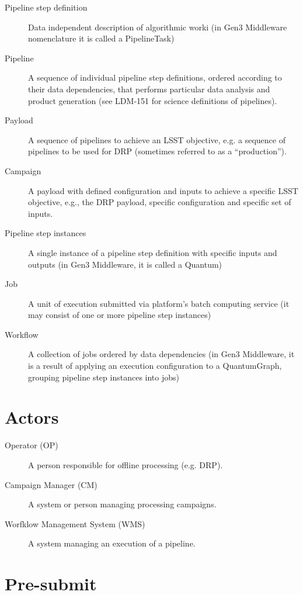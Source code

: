\documentclass[DM,lsstdraft,toc]{lsstdoc}
\begin{document}
\begin{description}
  \item[Pipeline step definition]
    Data independent description of algorithmic worki (in Gen3 Middleware
    nomenclature it is called a PipelineTask)
  \item[Pipeline] 
    A sequence of individual pipeline step definitions, ordered according to
    their data dependencies, that performs particular data analysis and product
    generation (see LDM-151 for science definitions of pipelines).
  \item[Payload]
    A sequence of pipelines to achieve an LSST objective, e.g. a sequence of
    pipelines to be used for DRP (sometimes referred to as a ``production'').
  \item[Campaign]
    A payload with defined configuration and inputs to achieve a specific LSST
    objective, e.g., the DRP payload, specific configuration and specific set
    of inputs.
  \item[Pipeline step instances]
    A single instance of a pipeline step definition with specific inputs and
    outputs (in Gen3 Middleware, it is called a Quantum)
  \item[Job]
    A unit of execution submitted via platform's batch computing service (it
    may consist of one or more pipeline step instances)
  \item[Workflow]
    A collection of jobs ordered by data dependencies (in Gen3 Middleware, it
    is a result of applying an execution configuration to a QuantumGraph,
    grouping pipeline step instances into jobs)
\end{description}

\section{Actors}

\begin{description}
  \item[Operator (OP)]
    A person responsible for offline processing (e.g. DRP).

  \item[Campaign Manager (CM)]
    A system or person managing processing campaigns.

  \item[Worfklow Management System (WMS)]
    A system managing an execution of a pipeline.
\end{description}


\section{Pre-submit}
\end{document}

